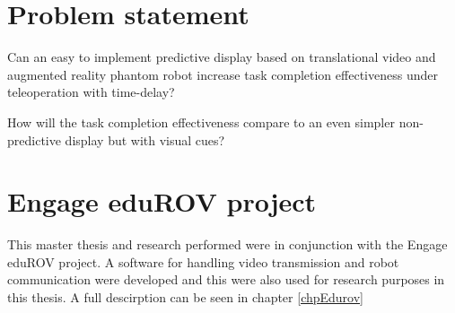 \section{Problem statement}

Can an easy to implement predictive display based on translational video and augmented reality phantom robot increase task completion effectiveness under teleoperation with time-delay?

How will the task completion effectiveness compare to an even simpler non-predictive display but with visual cues?

\section{Engage eduROV project}

This master thesis and research performed were in conjunction with the Engage eduROV project. A software for handling video transmission and robot communication were developed and this were also used for research purposes in this thesis. A full descirption can be seen in chapter \ref{chpEdurov}